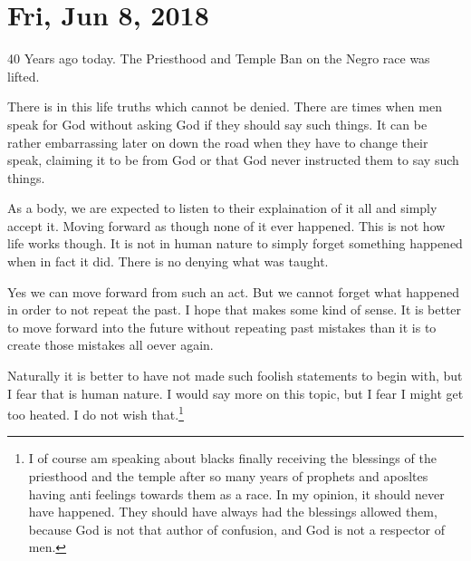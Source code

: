 \section{Fri, Jun 8, 2018}

40 Years ago today. The Priesthood and Temple Ban on the Negro race was lifted.

There is in this life truths which cannot be denied. There are times when men
speak for God without asking God if they should say such things. It can be
rather embarrassing later on down the road when they have to change their speak,
claiming it to be from God or that God never instructed them to say such things.

As a body, we are expected to listen to their explaination of it all and simply
accept it. Moving forward as though none of it ever happened. This is not how
life works though. It is not in human nature to simply forget something happened
when in fact it did. There is no denying what was taught.

Yes we can move forward from such an act. But we cannot forget what happened in
order to not repeat the past. I hope that makes some kind of sense. It is better
to move forward into the future without repeating past mistakes than it is to
create those mistakes all oever again.

Naturally it is better to have not made such foolish statements to begin with,
but I fear that is human nature. I would say more on this topic, but I fear I
might get too heated. I do not wish that.\footnote{I of course am speaking about
blacks finally receiving the blessings of the priesthood and the temple after
so many years of prophets and aposltes having anti feelings towards them as a 
race. In my opinion, it should never have happened. They should have always
had the blessings allowed them, because God is not that author of confusion,
and God is not a respector of men.}